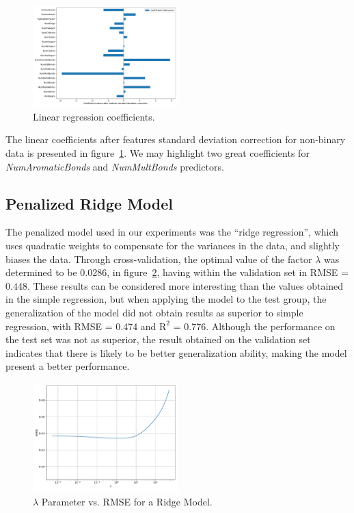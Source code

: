 \begin{figure}[htbp!]
  \centerline{\includegraphics[width=0.5\textwidth]{../../code/hw2/figures/2-linear-regression-coefficients.pdf}}
  \caption{Linear regression coefficients.}
  \label{fig:2-linear-regression-coefficients}
\end{figure}


The linear coefficients after features standard deviation correction for non-binary data is presented in figure~\ref{fig:2-linear-regression-coefficients}. We may highlight two great coefficients for \textit{NumAromaticBonds} and \textit{NumMultBonds} predictors.

\subsection{Penalized Ridge Model}
The penalized model used in our experiments was the ``ridge regression'', which uses quadratic weights to compensate for the variances in the data, and slightly biases the data. Through cross-validation, the optimal value of the factor $\lambda$ was determined to be 0.0286, in figure~\ref{fig:3-lambda-ridge}, having within the validation set in RMSE = 0.448. These results can be considered more interesting than the values obtained in the simple regression, but when applying the model to the test group, the generalization of the model did not obtain results as superior to simple regression, with RMSE = 0.474 and $\text{R}^2$ = 0.776. Although the performance on the test set was not as superior, the result obtained on the validation set indicates that there is likely to be better generalization ability, making the model present a better performance.

\begin{figure}[htbp!]
  \centerline{\includegraphics[width=0.5\textwidth]{../../code/hw2/figures/3-lambda-ridge.pdf}}
  \caption{$\lambda$ Parameter vs. RMSE for a Ridge Model.}
  \label{fig:3-lambda-ridge}
\end{figure}

